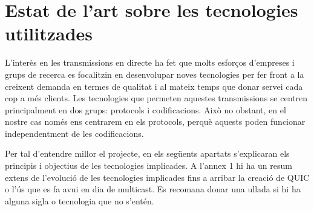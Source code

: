\section{Estat de l'art sobre les tecnologies utilitzades}
{
    L'interès en les transmissions en directe ha fet que molts esforços d'empreses i grups de recerca
    es focalitzin en desenvolupar noves tecnologies per fer front a la creixent demanda en termes de qualitat
    i al mateix temps que donar servei cada cop a més clients. Les tecnologies que permeten aquestes transmissions
    se centren principalment en dos grups: protocols i codificacions. Això no obstant, en el nostre cas només ens centrarem
    en els protocols, perquè aquests poden funcionar independentment de les codificacions.
    
    Per tal d'entendre millor el projecte, en els següents apartats s'explicaran els principis i objectius de les
    tecnologies implicades. A l'annex 1 hi ha un resum extens de l'evolució de les tecnologies implicades fins a arribar
    la creació de QUIC o l'ús que es fa avui en dia de multicast. Es recomana donar una ullada si hi ha alguna sigla o tecnologia
    que no s'entén.
}


